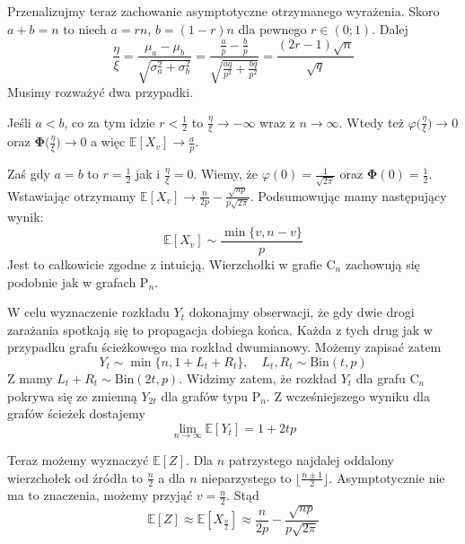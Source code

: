Przenalizujmy teraz zachowanie asymptotyczne otrzymanego wyrażenia. Skoro $a+b=n$ to niech $a=rn$, $b=(1-r)n$ dla pewnego $r\in(0;1)$. Dalej 
\[
    \frac{\eta}{\xi}=\frac{\mu_a-\mu_b}{\sqrt{\sigma_a^2+\sigma_b^2}}=\frac{\frac{a}{p}-\frac{b}{p}}{\sqrt{\frac{aq}{p^2}+\frac{bq}{p^2}}}=\frac{(2r-1)\sqrt{n}}{\sqrt{q}}
\]
Musimy rozważyć dwa przypadki.

Jeśli $a<b$, co za tym idzie $r<\frac{1}{2}$ to $\frac{\eta}{\xi}\to -\infty$ wraz z $n\to \infty$. Wtedy też $\varphi\Big(\frac{\eta}{\xi}\Big)\to 0$ oraz $\mathbf{\Phi}\Big(\frac{\eta}{\xi}\Big)\to 0$ a więc $\mathbb{E}[X_v] \to \frac{a}{p}$. 

Zaś gdy $a=b$ to $r=\frac{1}{2}$ jak i  $\frac{\eta}{\xi}=0$. Wiemy, że $\varphi(0)=\frac{1}{\sqrt{2\pi}}$ oraz $\mathbf{\Phi}(0)=\frac{1}{2}$. Wstawiając otrzymamy $\mathbb{E}[X_v] \to \frac{n}{2p}-\frac{\sqrt{np}}{p\sqrt{2\pi}}$. 
Podsumowując mamy następujący wynik:
\[
    \mathbb{E}[X_v] \sim \frac{\min\{v,n-v\}}{p}
\]
Jest to całkowicie zgodne z intuicją. Wierzchołki w grafie $\mathrm{C}_n$ zachowują się podobnie jak w grafach $\mathrm{P}_n$.

W celu wyznaczenie rozkładu $Y_t$ dokonajmy obserwacji, że gdy dwie drogi zarażania spotkają się to propagacja dobiega końca. Każda z tych drug jak w przypadku grafu ścieżkowego ma rozkład dwumianowy. Możemy zapisać zatem
\[
    Y_t \sim \min\{n, 1+ L_t + R_t\}, \quad L_t,R_t\sim \mathrm{Bin}(t,p)
\] 
Z  mamy $L_t+R_t\sim\mathrm{Bin}(2t,p)$. Widzimy zatem, że rozkład $Y_t$ dla grafu $\mathrm{C}_n$ pokrywa się ze zmienną $Y_{2t}$ dla grafów typu $\mathrm{P}_n$. Z wcześniejszego wyniku dla grafów ścieżek dostajemy
\[
    \lim_{n\to\infty} \mathbb{E}[Y_t] = 1+2tp
\]

Teraz możemy wyznaczyć $\mathbb{E}[Z]$. Dla $n$ patrzystego najdalej oddalony wierzchołek od źródła to $\frac{n}{2}$ a dla $n$ nieparzystego to $\lfloor \frac{n\pm 1}{2}\rfloor$. Asymptotycznie nie ma to znaczenia, możemy przyjąć $v=\frac{n}{2}$. Stąd
\[
    \mathbb{E}[Z] \approx \mathbb{E}[X_{\frac{n}{2}}] \approx \frac{n}{2p}-\frac{\sqrt{np}}{p\sqrt{2\pi}}
\]

